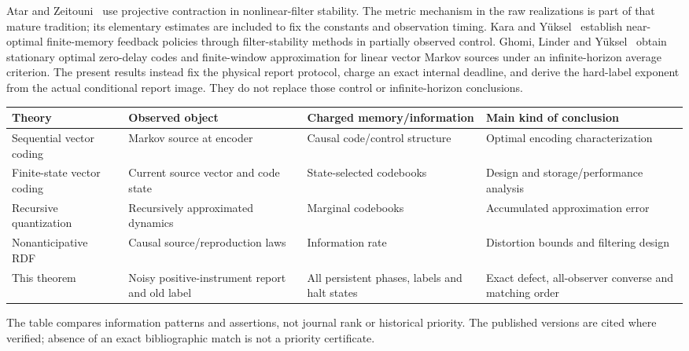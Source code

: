 Atar and Zeitouni~\cite{atar} use projective contraction in nonlinear-filter stability. The metric mechanism in the raw realizations is part of that mature tradition; its elementary estimates are included to fix the constants and observation timing. Kara and Y\"uksel~\cite{kara} establish near-optimal finite-memory feedback policies through filter-stability methods in partially observed control. Ghomi, Linder and Y\"uksel~\cite{ghomi} obtain stationary optimal zero-delay codes and finite-window approximation for linear vector Markov sources under an infinite-horizon average criterion. The present results instead fix the physical report protocol, charge an exact internal deadline, and derive the hard-label exponent from the actual conditional report image. They do not replace those control or infinite-horizon conclusions.

\begin{center}\small
\begin{tabular}{p{}p{}p{}p{}}
\toprule
Theory & Observed object & Charged memory/information & Main kind of conclusion\\
\midrule
Sequential vector coding~\cite{borkar} & Markov source at encoder & Causal code/control structure & Optimal encoding characterization\\[3pt]
Finite-state vector coding~\cite{foster} & Current source vector and code state & State-selected codebooks & Design and storage/performance analysis\\[3pt]
Recursive quantization~\cite{pages} & Recursively approximated dynamics & Marginal codebooks & Accumulated approximation error\\[3pt]
Nonanticipative RDF~\cite{stavrou2018,tanaka} & Causal source/reproduction laws & Information rate & Distortion bounds and filtering design\\[3pt]
This theorem & Noisy positive-instrument report and old label & All persistent phases, labels and halt states & Exact defect, all-observer converse and matching order\\
\bottomrule
\end{tabular}
\end{center}
The table compares information patterns and assertions, not journal rank or historical priority. The published versions are cited where verified; absence of an exact bibliographic match is not a priority certificate.

